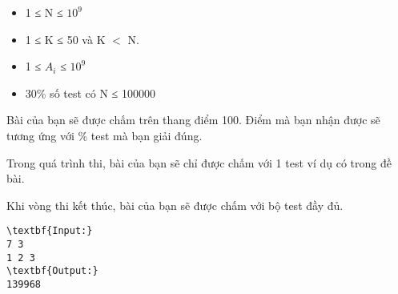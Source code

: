 \begin{itemize}
	\item 1 ≤ N ≤ $10^{9}$
	\item 1 ≤ K ≤ 50 và K $<$ N.
	\item 1 ≤ $A_{i}$ ≤ $10^{9}$
	\item 30\% số test có N ≤ 100000
\end{itemize}
Bài của bạn sẽ được chấm trên thang điểm 100. Điểm mà bạn nhận được sẽ tương ứng với \% test mà bạn giải đúng.

Trong quá trình thi, bài của bạn sẽ chỉ được chấm với 1 test ví dụ có trong đề bài.

Khi vòng thi kết thúc, bài của bạn sẽ được chấm với bộ test đầy đủ.
\begin{verbatim}
\textbf{Input:}
7 3
1 2 3
\textbf{Output:}
139968\end{verbatim}